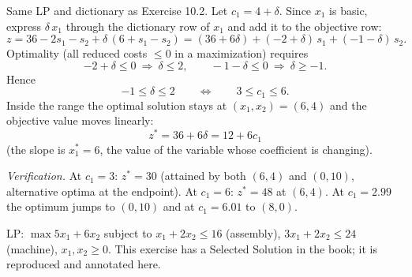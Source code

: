 
Same LP and dictionary as Exercise 10.2. Let $c_1 = 4 + \delta$. Since $x_1$ is basic, express $\delta\, x_1$ through the dictionary row of $x_1$ and add it to the objective row:
\[
z = 36 - 2s_1 - s_2 + \delta\,(6 + s_1 - s_2)
  = (36 + 6\delta) + (-2 + \delta)\,s_1 + (-1 - \delta)\,s_2 .
\]
Optimality (all reduced costs $\le 0$ in a maximization) requires
\[
-2 + \delta \le 0 \ \Rightarrow\ \delta \le 2,
\qquad
-1 - \delta \le 0 \ \Rightarrow\ \delta \ge -1 .
\]
Hence
\[
-1 \le \delta \le 2
\qquad\Longleftrightarrow\qquad
\boxed{3 \le c_1 \le 6}.
\]
Inside the range the optimal solution stays at $(x_1, x_2) = (6, 4)$ and the objective value moves linearly:
\[
z^* = 36 + 6\delta = 12 + 6 c_1
\]
(the slope is $x_1^* = 6$, the value of the variable whose coefficient is changing).

\emph{Verification.} At $c_1 = 3$: $z^* = 30$ (attained by both $(6,4)$ and $(0,10)$, alternative optima at the endpoint). At $c_1 = 6$: $z^* = 48$ at $(6,4)$. At $c_1 = 2.99$ the optimum jumps to $(0, 10)$ and at $c_1 = 6.01$ to $(8, 0)$.


LP: $\max 5x_1 + 6x_2$ subject to $x_1 + 2x_2 \le 16$ (assembly), $3x_1 + 2x_2 \le 24$ (machine), $x_1, x_2 \ge 0$. This exercise has a Selected Solution in the book; it is reproduced and annotated here.

